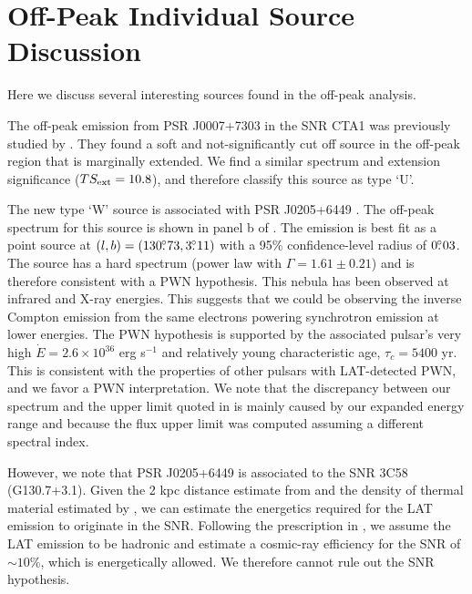 \section{Off-Peak Individual Source Discussion}

Here we discuss several interesting sources found in the off-peak
analysis.

The off-peak emission from PSR J0007+7303 in the SNR CTA1 was previously
studied by \cite{abdo_2012a_j00077303-supernova}.  They found a soft and
not-significantly cut off source in the off-peak region that is marginally
extended.  We find a similar spectrum and extension significance ($TS_{\rm
ext}=10.8$), and therefore classify this source as type `U'.

The new type `W' source is associated with PSR J0205+6449
\citep{abdo_2009a_discovery-pulsations}.  The off-peak spectrum for this
source is shown in panel b of .  The emission
is best fit as a point source at $(l,b)=(130\mbox{$.\!\!^\circ$}73,3\mbox{$.\!\!^\circ$}11)$ with a
95\% confidence-level radius of $0\mbox{$.\!\!^\circ$}03$.  The source has a hard
spectrum (power law with $\Gamma=1.61\pm0.21$) and is therefore
consistent with a PWN hypothesis.  This nebula has been observed
at infrared \citep{slane_2008a_infrared-detection} and X-ray
\citep{slane_2004a_constraints-structure} energies. This suggests
that we could be observing the inverse Compton emission from the same
electrons powering synchrotron emission at lower energies.  The PWN
hypothesis is supported by the associated pulsar's very high $\dot
E=2.6\times10^{36}$ erg s$^{-1}$ and relatively young characteristic
age, $\tau_c = 5400$ yr. This is consistent with the properties of
other pulsars with LAT-detected PWN, and we favor a PWN interpretation.
We note that the discrepancy between our spectrum and the upper limit
quoted in \citet{ackermann_2011a_fermi-lat-search} is mainly caused by
our expanded energy range and because the flux upper limit was computed
assuming a different spectral index.

However, we note that PSR J0205+6449 is associated to the
SNR 3C58 (G130.7+3.1).  Given the 2 kpc distance estimate from
\cite{abdo_2013a_second-fermi} and the density of thermal material
estimated by \cite{slane_2004a_constraints-structure}, we can estimate
the energetics required for the LAT emission to originate in the SNR.
Following the prescription in \cite{drury_1994a_gamma-ray-visibility},
we assume the LAT emission to be hadronic and estimate a cosmic-ray
efficiency for the SNR of $\sim10$\%, which is energetically allowed.
We therefore cannot rule out the SNR hypothesis.

